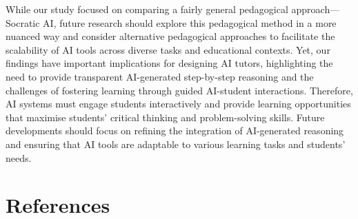 \documentclass[
  11pt,
]{article}
\begin{document}
While our study focused on comparing a fairly general pedagogical approach---Socratic AI, future research should explore this pedagogical method in a more nuanced way and consider alternative pedagogical approaches to facilitate the scalability of AI tools across diverse tasks and educational contexts. Yet, our findings have important implications for designing AI tutors, highlighting the need to provide transparent AI-generated step-by-step reasoning and the challenges of fostering learning through guided AI-student interactions. Therefore, AI systems must engage students interactively and provide learning opportunities that maximise students' critical thinking and problem-solving skills. Future developments should focus on refining the integration of AI-generated reasoning and ensuring that AI tools are adaptable to various learning tasks and students' needs.

\section*{References}\label{references}
\end{document}
